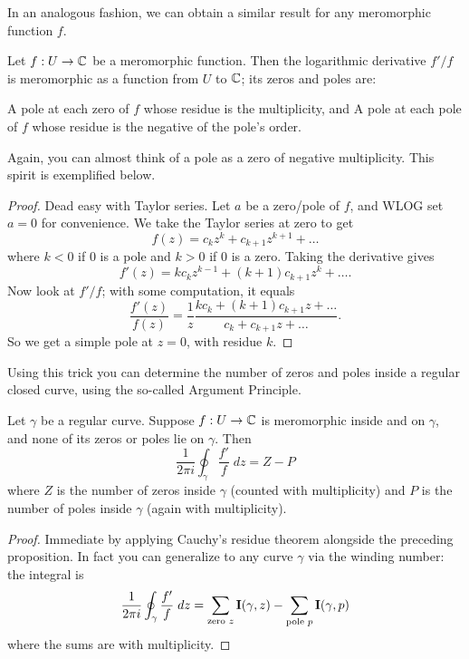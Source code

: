 In an analogous fashion, we can obtain a similar result for any meromorphic function $f$.
\begin{proposition}
	Let $f : U \to \mathbb C$ be a meromorphic function.
	Then the logarithmic derivative $f'/f$ is meromorphic as a function from $U$ to $\mathbb C$;
	its zeros and poles are:
	\begin{enumerate}[(i)]
		\ii A pole at each zero of $f$ whose residue is the multiplicity, and
		\ii A pole at each pole of $f$ whose residue is the negative of the pole's order.
	\end{enumerate}
\end{proposition}
Again, you can almost think of a pole as a zero of negative multiplicity.
This spirit is exemplified below.
\begin{proof}
	Dead easy with Taylor series.
	Let $a$ be a zero/pole of $f$, and WLOG set $a=0$ for convenience.
	We take the Taylor series at zero to get
	\[ f(z) = c_kz^k + c_{k+1}z^{k+1} + \dots \]
	where $k < 0$ if $0$ is a pole and $k > 0$ if $0$ is a zero.
	Taking the derivative gives
	\[ f'(z) = kc_k z^{k-1} + (k+1)c_{k+1}z^{k} + \dots. \]
	Now look at $f'/f$; with some computation, it equals
	\[
		\frac{f'(z)}{f(z)}
		= \frac 1z \frac{kc_k + (k+1)c_{k+1}z + \dots}{c_k + c_{k+1}z + \dots}.
	\]
	So we get a simple pole at $z=0$, with residue $k$.
\end{proof}

Using this trick you can determine the number of zeros and poles inside a regular closed curve,
using the so-called Argument Principle.

\begin{theorem}
	\label{thm:arg_principle}
	Let $\gamma$ be a regular curve.
	Suppose $f : U \to \mathbb C$ is meromorphic inside and on $\gamma$, and
	none of its zeros or poles lie on $\gamma$.
	Then
	\[
		\frac{1}{2\pi i} \oint_\gamma \frac{f'}{f} \; dz
		= Z - P
	\]
	where $Z$ is the number of zeros inside $\gamma$ (counted with multiplicity)
	and $P$ is the number of poles inside $\gamma$ (again with multiplicity).
\end{theorem}
\begin{proof}
	Immediate by applying Cauchy's residue theorem alongside the preceding proposition.
	In fact you can generalize to any curve $\gamma$ via the winding number:
	the integral is
	\[ \frac{1}{2\pi i} \oint_\gamma \frac{f'}{f} \; dz
		= \sum_{\text{zero $z$}} \operatorname{\mathbf I}(\gamma,z)
		- \sum_{\text{pole $p$}} \operatorname{\mathbf I}(\gamma,p) \]
	where the sums are with multiplicity.
\end{proof}

